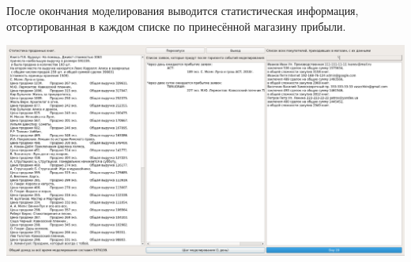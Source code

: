 \documentclass[final,12pt]{article}
\begin{document}
После окончания моделирования выводится статистическая информация, отсортированная в каждом списке по принесённой магазину прибыли.

\includegraphics[width=1.0\textwidth]{final_20.png}
\end{document}
